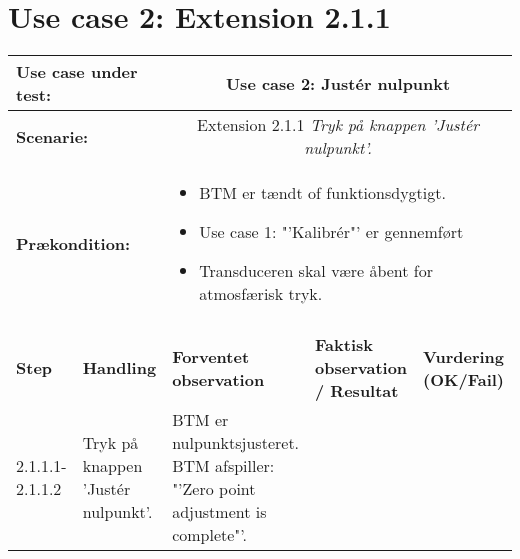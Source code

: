 \section{Use case 2: Extension 2.1.1}
\begin{tabular}{|p{1cm}|p{3cm}|p{4cm}|p{4cm}|p{2cm}|}
\hline
\multicolumn{2}{|p{3cm}|}{\textbf{Use case under test:}} & \multicolumn{3}{c|}{Use case 2: Justér nulpunkt} \\\hline

\multicolumn{2}{|p{3cm}|}{\textbf{Scenarie:}} & \multicolumn{3}{c|}{Extension 2.1.1 \textit{Tryk på knappen 'Justér nulpunkt'.}} \\\hline

\multicolumn{2}{|p{3cm}|}{\textbf{Prækondition:}}  & \multicolumn{3}{l|}{\parbox{0.6\textwidth}{
\begin{itemize}[label=$\circ$]
\item BTM er tændt of funktionsdygtigt.
\item Use case 1: "'Kalibrér"' er gennemført
\item Transduceren skal være åbent for atmosfærisk tryk.  
\end{itemize} }}\\\hline

\multicolumn{5}{|c|}{} \\\hline

\textbf{Step} & \textbf{Handling} & \textbf{Forventet observation} & \textbf{Faktisk observation / Resultat} & \textbf{Vurdering (OK/Fail)}\\\hline

2.1.1.1-2.1.1.2 & Tryk på knappen 'Justér nulpunkt'. & BTM er nulpunktsjusteret. BTM afspiller: "'Zero point adjustment is complete"'. & & \\\hline

\end{tabular}

